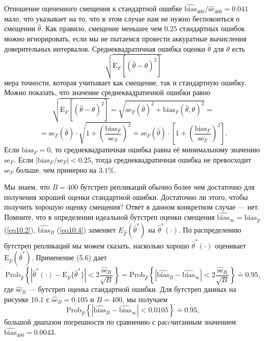 Отношение оцененного смещения к стандартной ошибке $\widehat{\text{bias}}_{400}/\widehat{\text{se}}_{400} = 0.041$ мало, что указывает на то, что в этом случае нам не нужно беспокоиться о смещении $\hat{\theta}$. Как правило, смещение меньшее чем $0.25$ стандартных ошибок можно игнорировать, если мы не пытаемся провести аккуратные вычисления доверительных интервалов. Среднеквадратичная ошибка оценки $\hat{\theta}$ для $\theta$ есть $$\sqrt{\mathrm{E}_{F}\left[(\hat{\theta} - \theta)^{2}\right]}$$ мера точности, которая учитывает как смещение, так и стандартную ошибку. Можно показать, что значение среднеквадратичной ошибки равно
\begin{equation*}
   \sqrt{\mathrm{E}_{F}\left[(\hat{\theta} - \theta)^{2}\right]} = \sqrt{\text{se}_{F}(\hat{\theta})^{2} + \text{bias}_{F}(\hat{\theta}, \theta)^{2}} =
\end{equation*}
\begin{equation}\label{eq10.14}
   =\text{se}_{F}(\hat{\theta}) \cdot \sqrt{1 + \left(\frac{\text{bias}_{F}}{\text{se}_{F}}\right)^{2}} \doteq \text{se}_{F}(\hat{\theta}) \cdot \left[1 + \left(\frac{\text{bias}_{F}}{\text{se}_{F}}\right)^{2}\right].
\end{equation}
Если $\text{bias}_{F} = 0$, то среднеквадратичная ошибка равна её минимальному значению $\text{se}_{F}$. Если $|\text{bias}_{F}/\text{se}_{F}| < 0.25$, тогда среднеквадратичная ошибка не превосходит $\text{se}_{F}$ больше, чем примерно на $3.1\%$.

Мы знаем, что $B = 400$ бутстреп репликаций обычно более чем достаточно для получения хорошей оценки стандартной ошибки. Достаточно ли этого, чтобы получить хорошую оценку смещения? Ответ в данном конкретном случае --- нет. Помните, что в определении идеальной бутстреп оценки смещения  $\widehat{\text{bias}}_{\infty} = \text{bias}_{\hat{F}}$ (\ref{eq10.2}),  $\widehat{\text{bias}}_{B}$ (\ref{eq10.4}) заменяет $E_{\hat{F}}(\hat{\theta}^{*})$ на $\hat{\theta}^{*}(\cdot)$. По распределению бутстреп репликаций мы можем сказать, насколько хорошо $\hat{\theta}^{*}(\cdot)$ оценивает $\mathrm{E}_{\hat{F}}(\hat{\theta}^{*})$. Применение (5.6) дает
\begin{equation}\label{eq10.15}
    \text{Prob}_{\hat{F}}\left\{\left|\hat{\theta}^{*}(\cdot)-\mathrm{E}_{\hat{F}}\{\hat{\theta}^{*}\}\right| < 2\frac{\widehat{\text{se}}_{B}}{\sqrt{B}}\right\}
    = \text{Prob}_{\hat{F}}\left\{\left|\widehat{\text{bias}}_{B}-\widehat{\text{bias}}_{\infty}\right| < 2\frac{\widehat{\text{se}}_{B}}{\sqrt{B}}\right\} \doteq 0.95,
\end{equation}
где $\widehat{\text{se}}_{B}$ --- бутстреп оценка стандартной ошибки. Для бутстреп данных на рисунке 10.1 с $\widehat{\text{se}}_{B} = 0.105$ и $B = 400$, мы получаем
\begin{equation}\label{eq10.16}
    \text{Prob}_{\hat{F}}\left\{\left|\widehat{\text{bias}}_{B}-\widehat{\text{bias}}_{\infty}\right| < 0.0105\right\} \doteq 0.95,
\end{equation}
большой диапазон погрешности по сравнению с расcчитанным значением $\widehat{\text{bias}}_{400} = 0.0043$.

